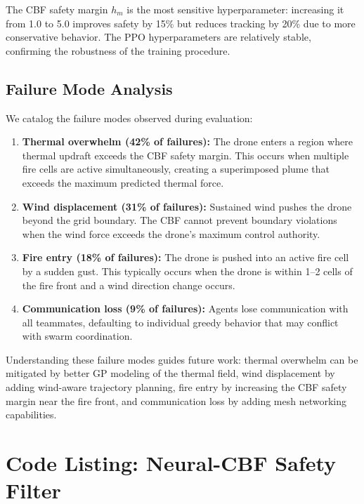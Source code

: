 \documentclass[12pt,a4paper]{article}
\begin{document}
The CBF safety margin $h_m$ is the most sensitive hyperparameter: increasing it from 1.0 to 5.0 improves safety by 15\% but reduces tracking by 20\% due to more conservative behavior. The PPO hyperparameters are relatively stable, confirming the robustness of the training procedure.

\subsection{Failure Mode Analysis}

We catalog the failure modes observed during evaluation:

\begin{enumerate}[leftmargin=*]
    \item \textbf{Thermal overwhelm (42\% of failures):} The drone enters a region where thermal updraft exceeds the CBF safety margin. This occurs when multiple fire cells are active simultaneously, creating a superimposed plume that exceeds the maximum predicted thermal force.
    
    \item \textbf{Wind displacement (31\% of failures):} Sustained wind pushes the drone beyond the grid boundary. The CBF cannot prevent boundary violations when the wind force exceeds the drone's maximum control authority.
    
    \item \textbf{Fire entry (18\% of failures):} The drone is pushed into an active fire cell by a sudden gust. This typically occurs when the drone is within 1--2 cells of the fire front and a wind direction change occurs.
    
    \item \textbf{Communication loss (9\% of failures):} Agents lose communication with all teammates, defaulting to individual greedy behavior that may conflict with swarm coordination.
\end{enumerate}

Understanding these failure modes guides future work: thermal overwhelm can be mitigated by better GP modeling of the thermal field, wind displacement by adding wind-aware trajectory planning, fire entry by increasing the CBF safety margin near the fire front, and communication loss by adding mesh networking capabilities.

\section{Code Listing: Neural-CBF Safety Filter}
\label{app:code}
\end{document}
